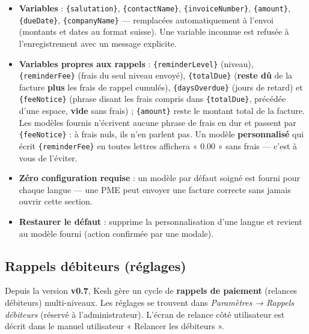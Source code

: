 \documentclass[a4paper,11pt,oneside]{article}
\begin{document}
\begin{itemize}
    \item \textbf{Variables} : \texttt{\{salutation\}},
          \texttt{\{contactName\}}, \texttt{\{invoiceNumber\}},
          \texttt{\{amount\}}, \texttt{\{dueDate\}},
          \texttt{\{companyName\}} — remplac\'ees automatiquement \`a
          l'envoi (montants et dates au format suisse). Une variable inconnue
          est refus\'ee \`a l'enregistrement avec un message explicite.
    \item \textbf{Variables propres aux rappels} :
          \texttt{\{reminderLevel\}} (niveau), \texttt{\{reminderFee\}}
          (frais du seul niveau envoy\'e), \texttt{\{totalDue\}} (\textbf{reste
          d\^u} de la facture \textbf{plus} les frais de rappel cumul\'es),
          \texttt{\{daysOverdue\}} (jours de retard) et \texttt{\{feeNotice\}}
          (phrase disant les frais compris dans \texttt{\{totalDue\}},
          pr\'ec\'ed\'ee d'une espace, \textbf{vide} sans frais) ;
          \texttt{\{amount\}} reste le montant total de la facture. Les mod\`eles
          fournis n'\'ecrivent aucune phrase de frais en dur et passent par
          \texttt{\{feeNotice\}} : \`a frais nuls, ils n'en parlent pas. Un mod\`ele
          \textbf{personnalis\'e} qui \'ecrit \texttt{\{reminderFee\}} en toutes
          lettres affichera « 0.00 » sans frais — c'est \`a vous de l'\'eviter.
    \item \textbf{Z\'ero configuration requise} : un mod\`ele par d\'efaut
          soign\'e est fourni pour chaque langue — une PME peut envoyer une
          facture correcte sans jamais ouvrir cette section.
    \item \textbf{Restaurer le d\'efaut} : supprime la personnalisation
          d'une langue et revient au mod\`ele fourni (action confirm\'ee par
          une modale).
\end{itemize}

\subsection{Rappels débiteurs (réglages)}\label{sec:dunning-settings-admin}

Depuis la version \textbf{v0.7}, Kesh gère un cycle de \textbf{rappels de paiement} (relances débiteurs) multi-niveaux. Les réglages se trouvent dans \emph{Paramètres → Rappels débiteurs} (réservé à l'administrateur). L'écran de relance côté utilisateur est décrit dans le manuel utilisateur « Relancer les débiteurs ».
\end{document}
